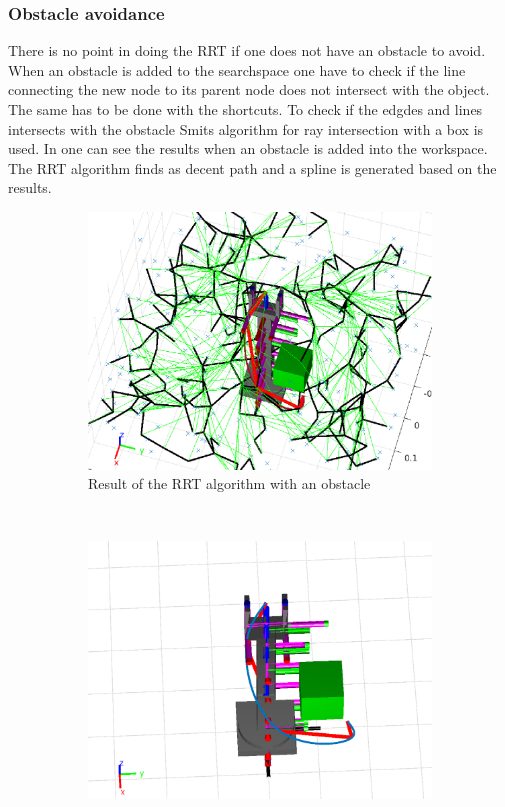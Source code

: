  \subsubsection{Obstacle avoidance}
 There is no point in doing the RRT if one does not have an obstacle to avoid. When an obstacle is added to the searchspace one have to check if the line connecting the new node to its parent node does not intersect with the object. The same has to be done with the shortcuts. To check if the edgdes and lines intersects with the obstacle Smits algorithm for ray intersection with a box is used\cite{Smits,Intersection}. In  one can see the results when an obstacle is added into the workspace. The RRT algorithm finds as decent path and a spline is generated based on the results. 

\def\picsSiz{1.08}
\begin{figure}[htbp]
    \centering
    \begin{subfigure}[htbp]{0.45\textwidth}
        \centering
        \includegraphics[width = \picsSiz\linewidth]{img/rrt3dOBav.eps}
        \caption{Result of the RRT algorithm with an obstacle}
        \label{fig:obav1}
    \end{subfigure}
    ~ 
    \begin{subfigure}[htbp]{0.45\textwidth}
        \centering
        \includegraphics[width = \picsSiz\linewidth]{img/rrt3dOBavPath.eps}

\end{subfigure}
\end{figure}
